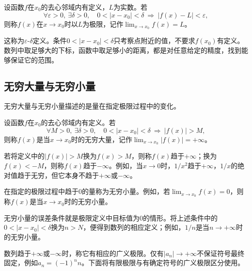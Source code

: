 \begin{definition}[函数的极限]
设函数\(f\)在\(x_0\)的去心邻域内有定义，\(L\)为实数。若
\begin{equation}\label{eq:analysis-function-limit-definition}
 \forall\varepsilon>0,\ \exists\delta>0,\quad
 0<|x-x_0|<\delta\ \Longrightarrow\ |f(x)-L|<\varepsilon,
\end{equation}
则称\(f(x)\)在\(x\to x_0\)时以\(L\)为极限，记作\(\lim_{x\to x_0}f(x)=L\)。
\end{definition}

这称为{\heiti{}\(\varepsilon\)-\(\delta\)定义}。条件\(0<|x-x_0|<\delta\)只考察点附近的值，不要求\(f(x_0)\)有定义。数列中取足够大的下标，函数中取足够小的距离，都是对任意给定的精度，找到能够保证它的范围。

\subsection{无穷大量与无穷小量}
无穷大量与无穷小量描述的是量在指定极限过程中的变化。

\begin{definition}[无穷大量]
设函数\(f\)在\(x_0\)的去心邻域内有定义。若
\begin{equation}
 \forall M>0,\ \exists\delta>0,\quad
 0<|x-x_0|<\delta\ \Longrightarrow\ |f(x)|>M,
\end{equation}
则称\(f(x)\)是当\(x\to x_0\)时的{\heiti{}无穷大量}，记作\(\lim_{x\to x_0}|f(x)|=+\infty\)。
\end{definition}

若将定义中的\(|f(x)|>M\)换为\(f(x)>M\)，则称\(f(x)\)趋于\(+\infty\)；换为\(f(x)<-M\)，则称\(f(x)\)趋于\(-\infty\)。例如，当\(x\to0\)时，\(1/x^2\)趋于\(+\infty\)，\(1/x\)的绝对值趋于无穷，但它本身不趋于\(+\infty\)或\(-\infty\)。

\begin{definition}[无穷小量]
在指定的极限过程中趋于\(0\)的量称为{\heiti{}无穷小量}。例如，若\(\lim_{x\to x_0}f(x)=0\)，则称\(f(x)\)是当\(x\to x_0\)时的无穷小量。
\end{definition}

无穷小量的误差条件就是极限定义中目标值为\(0\)的情形。将上述条件中的\(0<|x-x_0|<\delta\)换为\(n>N\)，便得到数列的相应定义；例如，\(1/n\)是当\(n\to+\infty\)时的无穷小量。

数列趋于\(+\infty\)或\(-\infty\)时，称它有相应的广义极限。仅有\(|a_n|\to+\infty\)不保证符号最终固定，例如\(a_n=(-1)^n n\)。下面将有限极限与有确定符号的广义极限区分使用。
